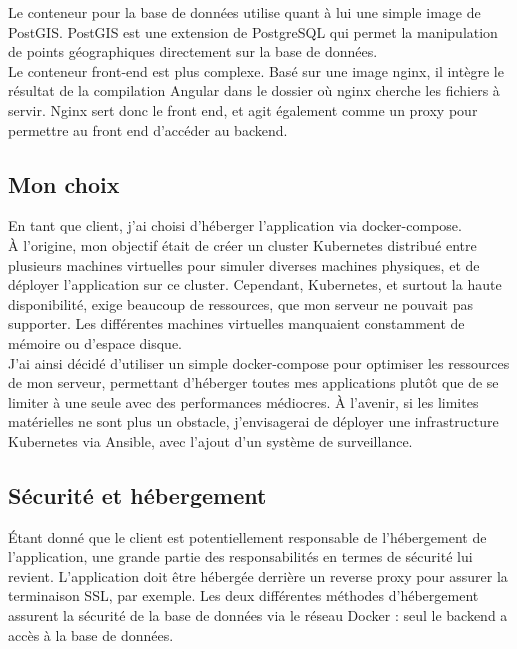 Le conteneur pour la base de données utilise quant à lui une simple image de PostGIS.
PostGIS est une extension de PostgreSQL qui permet la manipulation de points géographiques directement sur la base de données.\\

Le conteneur front-end est plus complexe.
Basé sur une image nginx, il intègre le résultat de la compilation Angular dans le dossier où nginx cherche les fichiers à servir.
Nginx sert donc le front end, et agit également comme un proxy pour permettre au front end d'accéder au backend.

\subsection{Mon choix}\label{subsec:mon-choix}
En tant que client, j'ai choisi d'héberger l'application via docker-compose.\\

À l'origine, mon objectif était de créer un cluster Kubernetes distribué entre plusieurs machines virtuelles pour simuler
diverses machines physiques, et de déployer l'application sur ce cluster.
Cependant, Kubernetes, et surtout la haute disponibilité, exige beaucoup de ressources, que mon serveur ne pouvait pas supporter.
Les différentes machines virtuelles manquaient constamment de mémoire ou d'espace disque.\\

J'ai ainsi décidé d'utiliser un simple docker-compose pour optimiser les ressources de mon serveur,
permettant d'héberger toutes mes applications plutôt que de se limiter à une seule avec des performances médiocres.
À l'avenir, si les limites matérielles ne sont plus un obstacle, j'envisagerai de déployer une infrastructure Kubernetes via Ansible,
avec l'ajout d'un système de surveillance.

\subsection{Sécurité et hébergement}\label{subsec:securite-et-hebergement}
Étant donné que le client est potentiellement responsable de l'hébergement de l'application, une grande partie des
responsabilités en termes de sécurité lui revient.
L'application doit être hébergée derrière un reverse proxy pour assurer la terminaison SSL, par exemple.
Les deux différentes méthodes d'hébergement assurent la sécurité de la base de données via le réseau Docker : seul le backend
a accès à la base de données.\\

